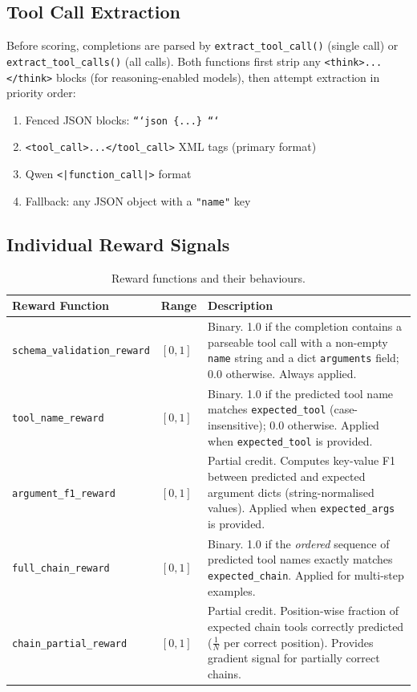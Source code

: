 \documentclass[12pt, a4paper]{article}
\newcommand{\thead}[1]{\textbf{#1}}
\begin{document}
\subsection{Tool Call Extraction}

Before scoring, completions are parsed by \texttt{extract\_tool\_call()} (single
call) or \texttt{extract\_tool\_calls()} (all calls). Both functions first strip
any \texttt{<think>...</think>} blocks (for reasoning-enabled models), then
attempt extraction in priority order:

\begin{enumerate}[leftmargin=1.5em, itemsep=3pt]
  \item Fenced JSON blocks: \texttt{```json \{...\} ```}
  \item \texttt{<tool\_call>...</tool\_call>} XML tags (primary format)
  \item Qwen \texttt{<|function\_call|>} format
  \item Fallback: any JSON object with a \texttt{"name"} key
\end{enumerate}

\subsection{Individual Reward Signals}

\begin{table}[H]
\centering
\caption{Reward functions and their behaviours.}
\begin{tabularx}{\linewidth}{L{4.5cm} C{1.5cm} L{8.2cm}}
\toprule
\thead{Reward Function} & \thead{Range} & \thead{Description} \\
\midrule
\texttt{schema\_validation\_reward} & $[0, 1]$ & Binary. 1.0 if the completion
  contains a parseable tool call with a non-empty \texttt{name} string and a
  dict \texttt{arguments} field; 0.0 otherwise. Always applied. \\[4pt]
\texttt{tool\_name\_reward} & $[0, 1]$ & Binary. 1.0 if the predicted tool name
  matches \texttt{expected\_tool} (case-insensitive); 0.0 otherwise. Applied
  when \texttt{expected\_tool} is provided. \\[4pt]
\texttt{argument\_f1\_reward} & $[0, 1]$ & Partial credit. Computes key-value
  F1 between predicted and expected argument dicts (string-normalised values).
  Applied when \texttt{expected\_args} is provided. \\[4pt]
\texttt{full\_chain\_reward} & $[0, 1]$ & Binary. 1.0 if the \textit{ordered}
  sequence of predicted tool names exactly matches \texttt{expected\_chain}.
  Applied for multi-step examples. \\[4pt]
\texttt{chain\_partial\_reward} & $[0, 1]$ & Partial credit. Position-wise
  fraction of expected chain tools correctly predicted ($\frac{1}{N}$ per
  correct position). Provides gradient signal for partially correct chains. \\
\bottomrule
\end{tabularx}
\end{table}
\end{document}
